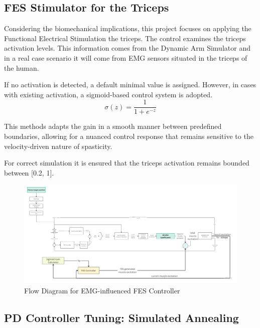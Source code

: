 \subsection{FES Stimulator for the Triceps}

Considering the biomechanical implications, this project focuses on applying the Functional Electrical Stimulation the triceps. The control examines the triceps activation levels. This information comes from the Dynamic Arm Simulator and in a real case scenario it will come from EMG sensors situated in the triceps of the human. 

If no activation is detected, a default minimal value is assigned. However, in cases with existing activation, a sigmoid-based control system is adopted. 
\begin{equation}\label{sigmoid}
    \sigma(z) = \frac{1}{1 + e^{-z}}
\end{equation}

This methods adapts the gain in a smooth manner between predefined boundaries, allowing for a nuanced control response that remains sensitive to the velocity-driven nature of spasticity.

For correct simulation it is ensured that the triceps activation remains bounded between [0.2, 1]. 


\newpage
\begin{landscape} %
  \begin{figure}[h!]
    \centering
    \includegraphics[width=1.7\textwidth]{Pictures/Controller/FESController.jpg} %
    \caption{Flow Diagram for EMG-influenced FES Controller} %
    \label{fig:FESController} %
  \end{figure}
\end{landscape} %

\subsection{PD Controller Tuning: Simulated Annealing}


